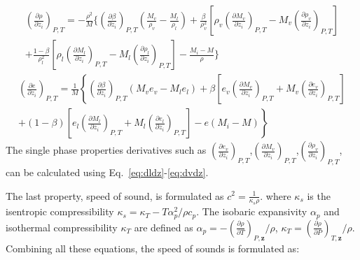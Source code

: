 \begin{align}
	\left(\frac{\partial \rho}{\partial z_i} \right)_{P,T}=
	- \frac{\rho^2}{M}\Bigg\{\left(\frac{\partial \beta}{\partial z_i}\right)_{P,T}\left(\frac{M_v}{\rho_v}-\frac{M_l}{\rho_l}\right) +
	\frac{\beta}{\rho_v^2}\left[\rho_v\left(\frac{\partial M_v}{\partial z_i} \right)_{P,T}-M_v \left(\frac{\partial \rho_v}{\partial z_i} \right)_{P,T}\right] \nonumber \\+
	\frac{1-\beta}{\rho_l^2}\left[\rho_l\left(\frac{\partial M_l}{\partial z_i} \right)_{P,T}-M_l \left(\frac{\partial \rho_l}{\partial z_i} \right)_{P,T}\right]- \frac{M_i-M}{\rho}\Bigg\}
\end{align}
\begin{align}
	\left(\frac{\partial e}{\partial z_i}\right)_{P,T}= \frac{1}{M}\left\{ \left(\frac{\partial \beta}{\partial z_i}\right)_{P,T} \left(M_v e_v-M_l e_l\right)+\beta \left[e_v\left(\frac{\partial M_v}{\partial z_i}\right)_{P,T}+M_v\left(\frac{\partial e_v}{\partial z_i}\right)_{P,T}\right]\right.\nonumber \\ \left.+\left(1-\beta\right)\left[e_l\left(\frac{\partial M_l}{\partial z_i}\right)_{P,T}+M_l\left(\frac{\partial e_l}{\partial z_i}\right)_{P,T}\right] - e \left(M_i-M\right)\right\}
\end{align}
The single phase properties derivatives such as $\left(\frac{\partial e_v}{\partial z_i}\right)_{P,T}$,$\left(\frac{\partial M_v}{\partial z_i}\right)_{P,T}$,$\left(\frac{\partial \rho_v}{\partial z_i} \right)_{P,T}$, can be calculated using Eq.~\ref{eq:dldz}-\ref{eq:dvdz}.


The last property, speed of sound, is formulated as
$c^2 = \frac{1}{\kappa_s\rho}$.
where $\kappa_s$ is the isentropic compressibility $\kappa_s = \kappa_T -T \alpha_p^2/\rho c_p$.  The isobaric expansivity $\alpha_p$ and isothermal compressibility $\kappa_T$ are defined as $\alpha_p=-\left(\frac{\partial \rho}{\partial T}\right)_{P,\mathbf{z}}/\rho$, $\kappa_T=\left(\frac{\partial \rho}{\partial P}\right)_{T,\mathbf{z}}/\rho $.
Combining all these equations, the speed of sounds is formulated as:

